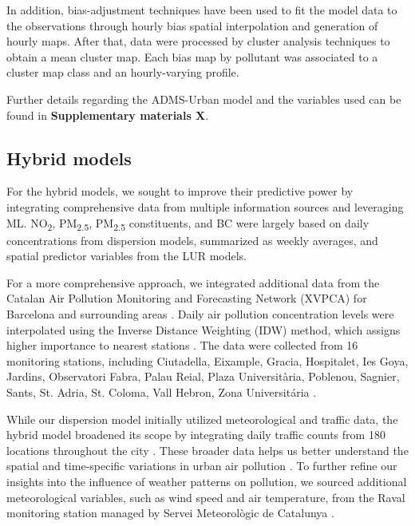 \documentclass{article}
\begin{document}
In addition, bias-adjustment techniques have been used to fit the model data to the observations through hourly bias spatial interpolation and generation of hourly maps. After that, data were processed  by cluster analysis techniques to obtain a mean cluster map. Each bias map by pollutant was associated to a cluster map class and an hourly-varying profile. 

Further details regarding the ADMS-Urban model and the variables used can be found in \textbf{Supplementary materials X}.

\subsection{Hybrid models}

For the hybrid models, we sought to improve their predictive power by integrating comprehensive data from multiple information sources and leveraging ML. NO\textsubscript{2}, PM\textsubscript{2.5}, PM\textsubscript{2.5} constituents, and BC were largely based on daily concentrations from dispersion models, summarized as weekly averages, and spatial predictor variables from the LUR models. 

For a more comprehensive approach, we integrated additional data from the Catalan Air Pollution Monitoring and Forecasting Network (XVPCA) for Barcelona and surrounding areas \cite{xarxa2012}. Daily air pollution concentration levels were interpolated using the Inverse Distance Weighting (IDW) method, which assigns higher importance to nearest stations \cite{hoek2017methods}. The data were collected from 16 monitoring stations, including Ciutadella, Eixample, Gracia, Hospitalet, Ies Goya, Jardins, Observatori Fabra, Palau Reial, Plaza Universitària, Poblenou, Sagnier, Sants, St. Adria, St. Coloma, Vall Hebron, Zona Universitária \cite{xarxa2012}.

While our dispersion model initially utilized meteorological and traffic data, the hybrid model broadened its scope by integrating daily traffic counts from 180 locations throughout the city \cite{trafficbcn}. These broader data helps us better understand the spatial and time-specific variations in urban air pollution \cite{pinto2020}. To further refine our insights into the influence of weather patterns on pollution, we sourced additional meteorological variables, such as wind speed and air temperature, from the Raval monitoring station managed by Servei Meteorològic de Catalunya \cite{xema2013}.
\end{document}
